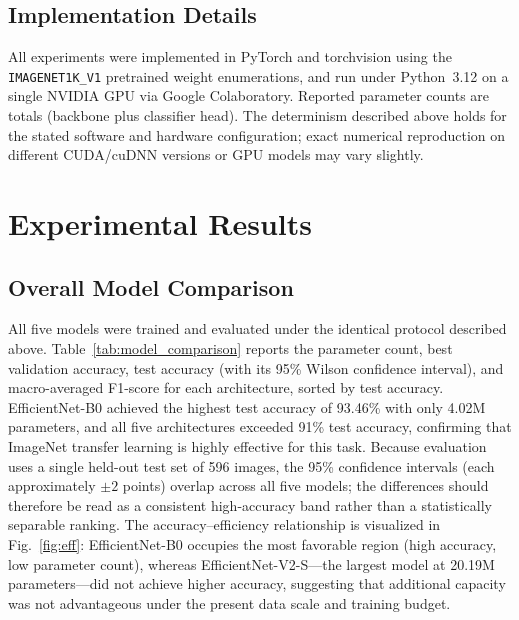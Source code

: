 \documentclass[ASNA, twocolumn]{USG}
\begin{document}
\subsection{Implementation Details}
All experiments were implemented in PyTorch and torchvision using the \texttt{IMAGENET1K\_V1} pretrained weight enumerations, and run under Python~3.12 on a single NVIDIA GPU via Google Colaboratory. Reported parameter counts are totals (backbone plus classifier head). The determinism described above holds for the stated software and hardware configuration; exact numerical reproduction on different CUDA/cuDNN versions or GPU models may vary slightly.

\section{Experimental Results}

\subsection{Overall Model Comparison}
All five models were trained and evaluated under the identical protocol described above. Table~\ref{tab:model_comparison} reports the parameter count, best validation accuracy, test accuracy (with its 95\% Wilson confidence interval), and macro-averaged F1-score for each architecture, sorted by test accuracy. EfficientNet-B0 achieved the highest test accuracy of 93.46\% with only 4.02M parameters, and all five architectures exceeded 91\% test accuracy, confirming that ImageNet transfer learning is highly effective for this task. Because evaluation uses a single held-out test set of 596 images, the 95\% confidence intervals (each approximately $\pm2$ points) overlap across all five models; the differences should therefore be read as a consistent high-accuracy band rather than a statistically separable ranking. The accuracy--efficiency relationship is visualized in Fig.~\ref{fig:eff}: EfficientNet-B0 occupies the most favorable region (high accuracy, low parameter count), whereas EfficientNet-V2-S---the largest model at 20.19M parameters---did not achieve higher accuracy, suggesting that additional capacity was not advantageous under the present data scale and training budget.
\end{document}
